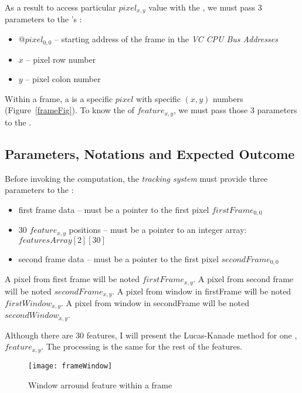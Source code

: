 As a result to access particular $pixel_{x,y}$ value with the \qpu, we must pass 3 parameters to the \vc's :
\begin{itemize}
	\item @$pixel_{0,0}$ -- starting address of the frame in the \emph{VC CPU Bus Addresses}
	\item $x$ -- pixel row number
	\item $y$ -- pixel colon number
\end{itemize}

Within a frame, a  is a specific $pixel$ with specific $(x,y)$ numbers (Figure~\ref{frameFig}). To know the  of $feature_{x,y}$, we must pass those 3 parameters to the .


\subsection{Parameters, Notations and Expected Outcome}

Before invoking the  computation, the \emph{tracking system} must provide three parameters to the \vc:

\begin{itemize}
	\item first frame data -- must be a pointer to the first pixel $firstFrame_{0,0}$
	\item 30 $feature_{x,y}$ positions -- must be a pointer to an integer array:  $featuresArray[2][30]$
	\item second frame data -- must be a pointer to the first pixel $secondFrame_{0,0}$
\end{itemize}

A pixel from first frame will be noted $firstFrame_{x,y}$. A pixel from second frame will be noted $secondFrame_{x,y}$. A pixel from window in firstFrame will be noted $firstWindow_{x,y}$. A pixel from window in secondFrame will be noted $secondWindow_{x,y}$.

Although there are 30 features, I will present the Lucas-Kanade method for one , $feature_{x,y}$. The processing is the same for the rest of the features.

\begin{figure}[!htbp]
	\centering
	\texttt{[image: frameWindow]}
	\caption{Window arround feature within a frame}
	\label{frameWindowFig}
\end{figure}
\FloatBarrier


